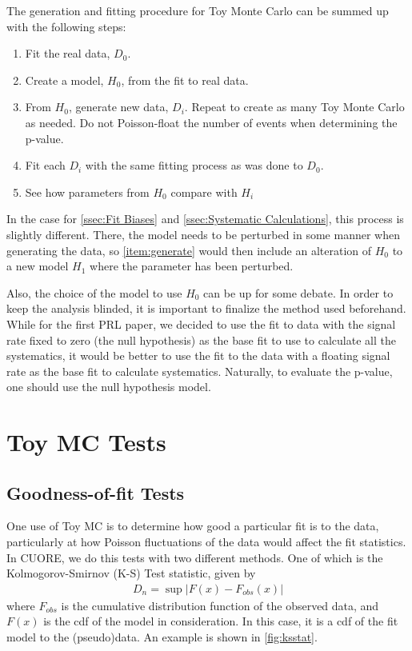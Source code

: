 The generation and fitting procedure for Toy Monte Carlo can be summed up with the following steps:
\begin{enumerate}
\item Fit the real data, $D_0$.
\item Create a model, $H_0$, from the fit to real data.
\item \label{item:generate} From $H_0$, generate new data, $D_i$. Repeat to create as many Toy Monte Carlo as needed. Do not Poisson-float the number of events when determining the p-value.
\item Fit each $D_i$ with the same fitting process as was done to $D_0$.
\item See how parameters from $H_0$ compare with $H_i$
\end{enumerate}

In the case for \autoref{ssec:Fit Biases} and \autoref{ssec:Systematic Calculations}, this process is slightly different. There, the model needs to be perturbed in some manner when generating the data, so \autoref{item:generate} would then include an alteration of $H_0$ to a new model $H_1$ where the parameter has been perturbed.

Also, the choice of the model to use $H_0$ can be up for some debate. In order to keep the analysis blinded, it is important to finalize the method used beforehand. While for the first PRL paper, we decided to use the fit to data with the signal rate fixed to zero (the null hypothesis) as the base fit to use to calculate all the systematics, it would be better to use the fit to the data with a floating signal rate as the base fit to calculate systematics. Naturally, to evaluate the p-value, one should use the null hypothesis model.


\section{Toy MC Tests}
\subsection*{Goodness-of-fit Tests}
\label{sec:Goodness-of-fit}
One use of Toy MC is to determine how good a particular fit is to the data, particularly at how Poisson fluctuations of the data would affect the fit statistics.
In CUORE, we do this tests with two different methods. One of which is the Kolmogorov-Smirnov (K-S) Test statistic, given by
\begin{eqnarray}
D_n = \sup|F(x) - F_{obs}(x)| 
\end{eqnarray}
where $F_{obs}$ is the cumulative distribution function of the observed data, and $F(x)$ is the cdf of the model in consideration. In this case, it is a cdf of the fit model to the (pseudo)data. An example is shown in \autoref{fig:ksstat}.

